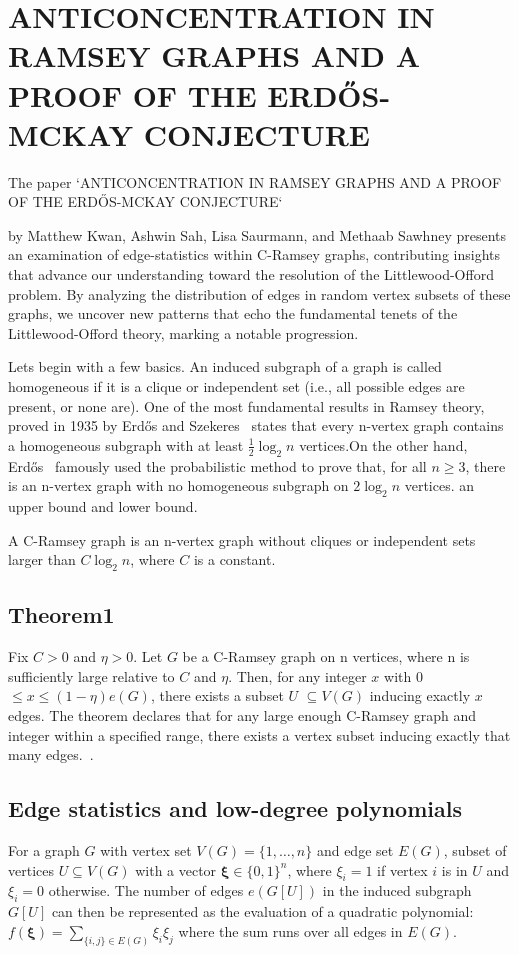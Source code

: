 \newpage


\section*{ANTICONCENTRATION IN RAMSEY GRAPHS AND A PROOF OF THE
ERDŐS-MCKAY CONJECTURE}
The paper `ANTICONCENTRATION IN RAMSEY GRAPHS AND A PROOF OF THE
ERDŐS-MCKAY CONJECTURE`~\cite{kwan2022anticoncentration}

by Matthew Kwan, Ashwin Sah, Lisa Saurmann, and Methaab Sawhney
presents an examination of edge-statistics within C-Ramsey graphs,
contributing insights that advance our understanding toward
the resolution of the Littlewood-Offord problem. 
By analyzing the distribution of edges in random vertex subsets of these graphs,
we uncover new patterns that echo the fundamental tenets of the 
Littlewood-Offord theory, marking a notable progression.

Lets begin with a few basics. An induced subgraph of a graph is called homogeneous 
if it is a clique or independent set (i.e., all possible edges are present, or none are).
One of the most fundamental results in Ramsey theory,
proved in 1935 by Erdős and Szekeres~\cite{erdos1935combinatorial}  states that every 
n-vertex graph contains a homogeneous subgraph with
at least $ \frac{1}{2} \log_2{n} $ vertices.On the other hand, Erdős~\cite{erdos1947some} famously used
the probabilistic method to prove that, for all $n \geq 3$, there is an n-vertex graph
with no homogeneous subgraph on $2 \log_2{n}$ vertices. an upper bound and lower bound.

A C-Ramsey graph is an n-vertex graph without cliques or independent sets 
larger than \(C \log_2 n\), where \(C\) is a constant.


\subsection{\textbf{Theorem1}} Fix  $C > 0$  and $ \eta > 0$. Let  $G$  be a  C-Ramsey graph on  n  vertices,
where  n  is sufficiently large relative to  $C$  and  $\eta$. Then, for any integer  $x$  with
0 $\leq x \leq (1 - \eta)e(G)$,  there exists a subset  $U$ $\subseteq V(G)$  inducing exactly 
$x$  edges.
The theorem declares that for any large enough C-Ramsey
graph and integer within a specified range, there exists a vertex
subset inducing exactly that many edges.~\cite{alon2003induced}.


\subsection{\textbf{Edge statistics and low-degree polynomials}}
For a graph $G$ with vertex set $V(G) = \{1, \ldots, n\}$ and edge set $E(G)$,
subset of vertices $U \subseteq V(G)$ with a vector
$\mathbf{\xi} \in \{0,1\}^n$, where $\xi_i = 1$ if vertex $i$ is in $U$ and $\xi_i = 0$ otherwise.
The number of edges $e(G[U])$ in the induced subgraph $G[U]$ can then be represented
as the evaluation of a quadratic polynomial: $f(\mathbf{\xi}) = \sum_{\{i,j\} \in E(G)} \xi_i \xi_j$
where the sum runs over all edges in $E(G)$. 

